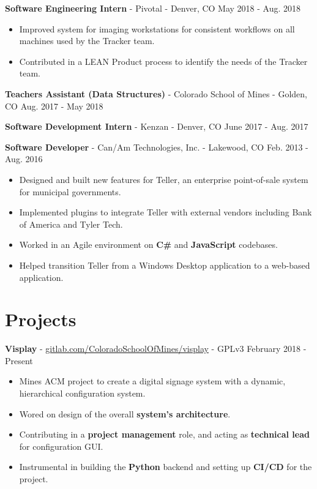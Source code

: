 \documentclass[10pt,letterpaper]{article}
\begin{document}
\textbf{Software Engineering Intern} - Pivotal - Denver, CO
\hfill May 2018 - Aug. 2018
\begin{itemize}
    \item Improved system for imaging workstations for consistent workflows on
        all machines used by the Tracker team.
    \item Contributed in a LEAN Product process to identify the needs of the
        Tracker team.
\end{itemize}

\vspace{2pt}
\textbf{Teachers Assistant (Data Structures)} - Colorado School of Mines -
Golden, CO \hfill Aug. 2017 - May 2018

\vspace{2pt}
\textbf{Software Development Intern} - Kenzan - Denver, CO
\hfill June 2017 - Aug. 2017

\vspace{2pt}
\textbf{Software Developer} - Can/Am Technologies, Inc. - Lakewood, CO
\hfill Feb. 2013 - Aug. 2016
\begin{itemize}
    \item Designed and built new features for Teller, an enterprise
        point-of-sale system for municipal governments.
    \item Implemented plugins to integrate Teller with external vendors
        including Bank of America and Tyler Tech.
    \item Worked in an Agile environment on \textbf{C\#} and \textbf{JavaScript}
        codebases.
    \item Helped transition Teller from a Windows Desktop application to a
        web-based application.
\end{itemize}

\section*{Projects}
\textbf{Visplay} -
\href{https://gitlab.com/ColoradoSchoolOfMines/visplay}{gitlab.com/ColoradoSchoolOfMines/visplay}
- GPLv3 \hfill February 2018 - Present
\begin{itemize}
    \item Mines ACM project to create a digital signage system with a dynamic,
        hierarchical configuration system.
    \item Wored on design of the overall \textbf{system's architecture}.
    \item Contributing in a \textbf{project management} role, and acting as
        \textbf{technical lead} for configuration GUI.
    \item Instrumental in building the \textbf{Python} backend and setting up
        \textbf{CI/CD} for the project.
\end{itemize}
\end{document}

